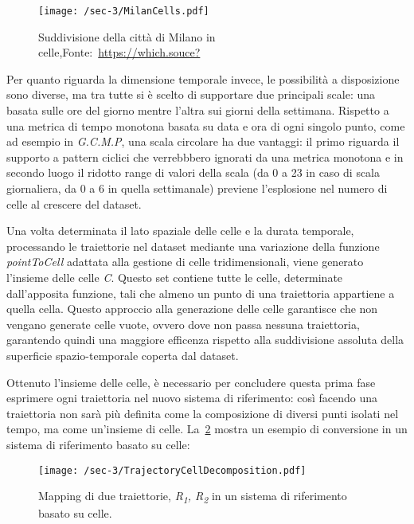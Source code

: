 \begin{figure}
  \centering
  \texttt{[image: /sec-3/MilanCells.pdf]}
  \caption{Suddivisione della città di Milano in celle,Fonte:~\url{https://which.souce?}}%
  \label{fig:chap-3:milan-cell-division}
\end{figure}

Per quanto riguarda la dimensione temporale invece, le possibilità a disposizione sono diverse, ma tra tutte si è scelto di supportare due principali scale: una basata sulle ore del giorno mentre l'altra sui giorni della settimana.
Rispetto a una metrica di tempo monotona basata su data e ora di ogni singolo punto, come ad esempio in \textit{G.C.M.P}, una scala circolare ha due vantaggi: il primo riguarda
il supporto a pattern ciclici che verrebbbero ignorati da una metrica monotona e in secondo luogo il ridotto range di valori della scala (da 0 a 23 in caso di scala giornaliera, da 0 a 6 in quella settimanale)
previene l'esplosione nel numero di celle al crescere del dataset.

Una volta determinata il lato spaziale delle celle e la durata temporale, processando le traiettorie nel dataset mediante una variazione della funzione \textit{pointToCell} adattata alla
gestione di celle tridimensionali, viene generato l'insieme delle celle \textit{C}. Questo set contiene tutte le celle, determinate dall'apposita funzione, tali che almeno
un punto di una traiettoria appartiene a quella cella. Questo approccio alla generazione delle celle garantisce che non vengano generate celle vuote, ovvero dove non passa nessuna traiettoria,
garantendo quindi una maggiore efficenza rispetto alla suddivisione assoluta della superficie spazio-temporale coperta dal dataset.

Ottenuto l'insieme delle celle, è necessario per concludere questa prima fase esprimere ogni traiettoria nel nuovo sistema di riferimento: così facendo una traiettoria non sarà più definita come
la composizione di diversi punti isolati nel tempo, ma come un'insieme di celle. La~\cref{fig:chap-3:trajectory-cell-division} mostra un esempio di conversione in un sistema di riferimento basato su celle:

\begin{figure}
  \centering
  \texttt{[image: /sec-3/TrajectoryCellDecomposition.pdf]}
  \caption{Mapping di due traiettorie, \textit{R\textsubscript{1}, R\textsubscript{2}} in un sistema di riferimento basato su celle.}%
  \label{fig:chap-3:trajectory-cell-division}
\end{figure}

